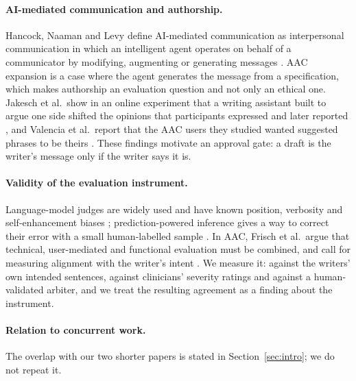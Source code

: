 \paragraph{AI-mediated communication and authorship.}
Hancock, Naaman and Levy define AI-mediated communication as interpersonal communication in which an intelligent agent operates on behalf of a communicator by modifying, augmenting or generating messages \cite{hancock2020aimc}. AAC expansion is a case where the agent generates the message from a specification, which makes authorship an evaluation question and not only an ethical one. Jakesch et al.\ show in an online experiment that a writing assistant built to argue one side shifted the opinions that participants expressed and later reported \cite{jakesch2023opinionated}, and Valencia et al.\ report that the AAC users they studied wanted suggested phrases to be theirs \cite{valencia2023less}. These findings motivate an approval gate: a draft is the writer's message only if the writer says it is. %

\paragraph{Validity of the evaluation instrument.}
Language-model judges are widely used and have known position, verbosity and self-enhancement biases \cite{zheng2023judging}; prediction-powered inference gives a way to correct their error with a small human-labelled sample \cite{angelopoulos2023ppi}. In AAC, Frisch et al.\ argue that technical, user-mediated and functional evaluation must be combined, and call for measuring alignment with the writer's intent \cite{frisch2026complicated}. We measure it: against the writers' own intended sentences, against clinicians' severity ratings and against a human-validated arbiter, and we treat the resulting agreement as a finding about the instrument.

\paragraph{Relation to concurrent work.}
The overlap with our two shorter papers \cite{concurrent_se4all,concurrent_caleai} is stated in Section~\ref{sec:intro}; we do not repeat it.
